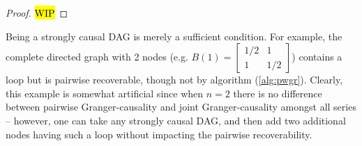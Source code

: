 \documentclass[12pt]{article}
\def\gcg{\mathcal{G}}  %
\newcommand{\pa}[1]{pa(#1)}  %
\newcommand{\anc}[1]{\mathcal{A}(#1)}  %
\begin{document}
\begin{proof}







\hl{WIP}
\end{proof}

\begin{example}
  Being a strongly causal DAG is merely a sufficient condition.  For example, the complete directed graph with 2 nodes (e.g. $B(1) = \left[ \begin{array}{cc} 1/2 & 1 \\ 1 & 1/2 \end{array} \right]$) contains a loop but is pairwise recoverable, though not by algorithm (\ref{alg:pwgr}).  Clearly, this example is somewhat artificial since when $n = 2$ there is no difference between pairwise Granger-causality and joint Granger-causality amongst all series -- however, one can take any strongly causal DAG, and then add two additional nodes having such a loop without impacting the pairwise recoverability.
\end{example}
\end{document}
